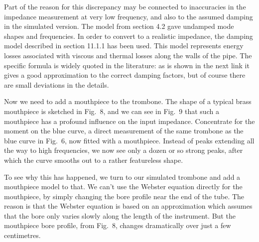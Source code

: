 
  Part of the reason for this discrepancy may be connected to inaccuracies in 
  the impedance measurement at very low frequency, and also to the assumed 
  damping in the simulated version. The model from section 4.2 gave undamped 
  mode shapes and frequencies. In order to convert to a realistic impedance, 
  the damping model described in section 11.1.1 has been used. This model 
  represents energy losses associated with viscous and thermal losses along the 
  walls of the pipe. The specific formula is widely quoted in the literature: 
  as is shown in the next link it gives a good approximation to the correct 
  damping factors, but of course there are small deviations in the details. 

  Now we need to add a mouthpiece to the trombone. The shape of a typical brass 
  mouthpiece is sketched in Fig.\ 8, and we can see in Fig.\ 9 that such a 
  mouthpiece has a profound influence on the input impedance. Concentrate for 
  the moment on the blue curve, a direct measurement of the same trombone as 
  the blue curve in Fig.\ 6, now fitted with a mouthpiece. Instead of peaks 
  extending all the way to high frequencies, we now see only a dozen or so 
  strong peaks, after which the curve smooths out to a rather featureless 
  shape. 



  To see why this has happened, we turn to our simulated trombone and add a 
  mouthpiece model to that. We can’t use the Webster equation directly for the 
  mouthpiece, by simply changing the bore profile near the end of the tube. The 
  reason is that the Webster equation is based on an approximation which 
  assumes that the bore only varies slowly along the length of the instrument. 
  But the mouthpiece bore profile, from Fig.\ 8, changes dramatically over just 
  a few centimetres. 

